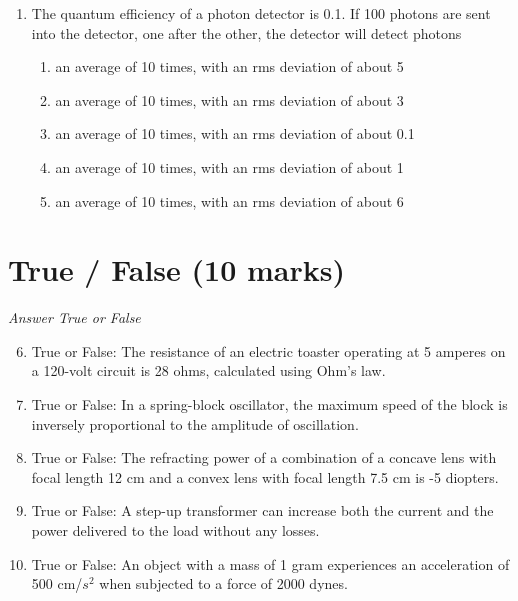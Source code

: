 \documentclass[12pt]{article}
\begin{document}
\begin{enumerate}[label=\arabic*.]
\begin{enumerate}[label=(\alph*)]
    \item ^6\_3 Li
    \item ^5\_2 He
\end{enumerate}
\item The quantum efficiency of a photon detector is 0.1. If 100 photons are sent into the detector, one after the other, the detector will detect photons
\begin{enumerate}[label=(\alph*)]
    \item an average of 10 times, with an rms deviation of about 5
    \item an average of 10 times, with an rms deviation of about 3
    \item an average of 10 times, with an rms deviation of about 0.1
    \item an average of 10 times, with an rms deviation of about 1
    \item an average of 10 times, with an rms deviation of about 6
\end{enumerate}
\end{enumerate}

\section*{True / False (10 marks)}
\textit{Answer True or False}
\begin{enumerate}[label=\arabic*.]
\setcounter{enumi}{5}
\item True or False: The resistance of an electric toaster operating at 5 amperes on a 120-volt circuit is 28 ohms, calculated using Ohm's law.
\item True or False: In a spring-block oscillator, the maximum speed of the block is inversely proportional to the amplitude of oscillation.
\item True or False: The refracting power of a combination of a concave lens with focal length 12 cm and a convex lens with focal length 7.5 cm is -5 diopters.
\item True or False: A step-up transformer can increase both the current and the power delivered to the load without any losses.
\item True or False: An object with a mass of 1 gram experiences an acceleration of 500 cm/$s^2$ when subjected to a force of 2000 dynes.
\end{enumerate}
\end{document}
